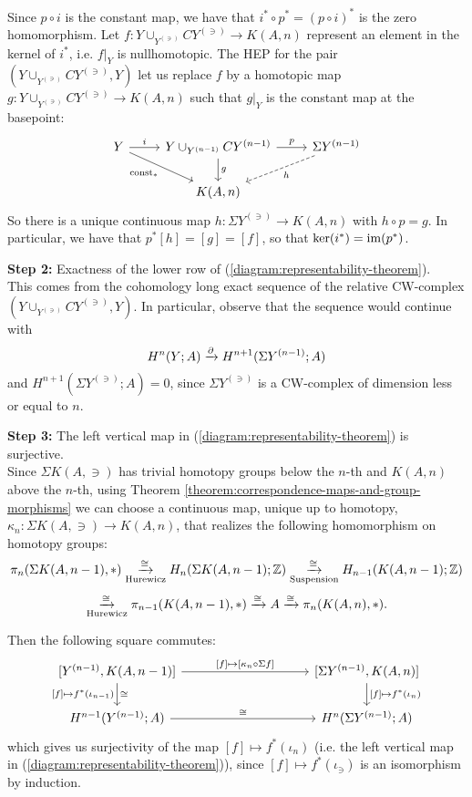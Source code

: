 Since $p\circ i$ is the constant map, we have that $i^*\circ p^*=(p\circ i)^*$ is the zero homomorphism. Let $f:Y\cup_{Y^{(\ni)}}CY^{(\ni)}\to K(A,n)$ represent an element in the kernel of $i^*$, i.e. $f|_Y$ is nullhomotopic. The HEP for the pair $(Y\cup_{Y^{(\ni)}}CY^{(\ni)},Y)$ let us replace $f$ by a homotopic map $g:Y\cup_{Y^{(\ni)}}CY^{(\ni)}\to K(A,n)$ such that $g|_Y$ is the constant map at the basepoint:
\[
\begin{tikzcd}
Y \ar[dr,"\const_*"'] \ar[r,"i"] & Y\cup_{Y^{(\ni)}}CY^{(\ni)} \ar[d,"g"] \ar[r,"p"] & \Sigma Y^{(\ni)} \ar[dl,dashed,"h"]\\
& K(A,n) &
\end{tikzcd}
\]
So there is a unique continuous map $h:\Sigma Y^{(\ni)}\to K(A,n)$ with $h\circ p=g$. In particular, we have that $p^*[h]=[g]=[f]$, so that $\ker(i^*)=\operatorname{im}(p^*)$.

\textbf{Step 2: }Exactness of the lower row of (\ref{diagram:representability-theorem}). \\
This comes from the cohomology long exact sequence of the relative CW-complex $(Y\cup_{Y^{(\ni)}}CY^{(\ni)},Y)$. In particular, observe that the sequence would continue with
\[H^n(Y;A)\xrightarrow{\partial} H^{n+1}(\Sigma Y^{({n-1})};A)\]
and $H^{n+1}(\Sigma Y^{(\ni)};A)=0$, since $\Sigma Y^{(\ni)}$ is a CW-complex of dimension less or equal to $n$.

\textbf{Step 3: }The left vertical map in (\ref{diagram:representability-theorem}) is surjective.\\
 Since $\Sigma K(A,\ni)$ has trivial homotopy groups below the $n$-th and $K(A,n)$ above the $n$-th, using Theorem \ref{theorem:correspondence-maps-and-group-morphisms} we can choose a continuous map, unique up to homotopy, $\kappa_n:\Sigma K(A,\ni)\to K(A,n)$, that realizes the following homomorphism on homotopy groups:
\[
    \pi_n(\Sigma K(A,{n-1}),*)\underset{\text{Hurewicz}}{\xrightarrow{\cong}}H_n(\Sigma K(A,{n-1});{\mathbb Z})\underset{\text{Suspension}}{\xrightarrow{\cong}} H_{n-1}(K(A,{n-1});{\mathbb Z})
\]
\[
    \underset{\text{Hurewicz}}{\xrightarrow{\cong}}\pi_{n-1}(K(A,{n-1}),*)\xrightarrow{\cong}A\xrightarrow{\cong}\pi_n(K(A,n),*).
\]

Then the following square commutes:
\[
\begin{tikzcd}[column sep=10em]
{[Y^{(\ni)},K(A,\ni)]} \ar[d,"\cong","{[f]}\mapsto f^*(\iota_\ni)"'] \ar[r,"{[f]}\mapsto{[\kappa_n\circ\Sigma f]}"] & {[\Sigma Y^{(\ni)},K(A,n)]} \ar[d,"{[f]}\mapsto f^*(\iota_n)"]\\
H^\ni(Y^{(\ni)};A) \ar[r,"\cong"] & H^n(\Sigma Y^{(\ni)};A)
\end{tikzcd}
\]
which gives us surjectivity of the map ${[f]}\mapsto f^*(\iota_n)$ (i.e. the left vertical map in (\ref{diagram:representability-theorem})), since ${[f]}\mapsto f^*(\iota_\ni)$ is an isomorphism by induction.

